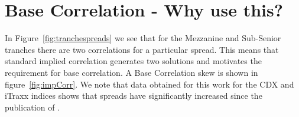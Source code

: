 \section{Base Correlation - Why use this?}


In Figure~\ref{fig:tranchespreads} we see that for the Mezzanine and Sub-Senior tranches there are two correlations for a particular spread.  This means that standard implied correlation generates two solutions and motivates the requirement for base correlation. A Base Correlation skew is shown in figure~\ref{fig:impCorr}.
We note that data obtained for this work for the CDX and iTraxx indices shows that spreads have significantly increased since the publication of \cite{KL2004,hw2004}.



